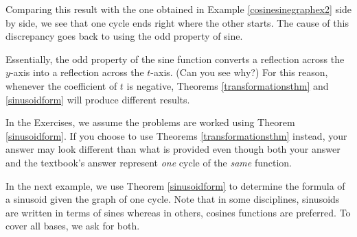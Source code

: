 \begin{tabular}{m{2in}m{1.5in}m{1.5in}}
\end{tabular}

\smallskip

Comparing this result with the one obtained in Example \ref{cosinesinegraphex2} side by side, we see that one cycle ends right where the other starts.  The cause of this discrepancy goes back to using the odd property of sine. 

\smallskip

 Essentially, the odd property of the sine function  converts a reflection across the $y$-axis into a reflection across the $t$-axis. (Can you see why?)  For this reason, whenever the coefficient of $t$ is negative, Theorems \ref{transformationsthm} and  \ref{sinusoidform} will produce different results.  
 
 \smallskip
 
 In the Exercises, we assume the problems are worked using Theorem \ref{sinusoidform}.  If you choose to use Theorems \ref{transformationsthm} instead, your answer may look different than what is provided even though both your answer and the textbook's answer represent \textit{one} cycle of the \textit{same} function.  

\smallskip

In the next example,  we use Theorem \ref{sinusoidform} to determine the formula of a sinusoid given the graph of one cycle.  Note that in some disciplines, sinusoids are written in terms of sines whereas in others,   cosines functions are preferred.  To cover all bases,  we ask for both.

